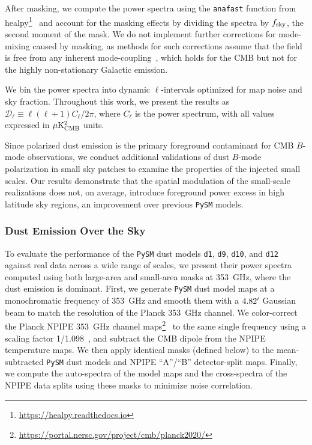\documentclass[twocolumn]{aastex631}
\begin{document}
After masking, we compute the power spectra using the \texttt{anafast} function from healpy\footnote{\url{https://healpy.readthedocs.io}}~\citep{Zonca:2019} and account for the masking effects by dividing the spectra by $f_{\rm sky}$, the second moment of the mask. We do not implement further corrections for mode-mixing caused by masking, as methods for such corrections assume that the field is free from any inherent mode-coupling~\citep[e.g.,][]{Hivon:2002}, which holds for the CMB but not for the highly non-stationary Galactic emission. 

We bin the power spectra into dynamic $\ell$-intervals optimized for map noise and sky fraction. Throughout this work, we present the results as $\mathcal{D}_\ell \equiv \ell(\ell + 1) C_\ell / 2\pi$, where $C_\ell$ is the power spectrum, with all values expressed in $\mu{\rm K^2_{CMB}}$ units. 

Since polarized dust emission is the primary foreground contaminant for CMB $B$-mode observations, we conduct additional validations of dust $B$-mode polarization in small sky patches to examine the properties of the injected small scales. Our results demonstrate that the spatial modulation of the small-scale realizations does not, on average, introduce foreground power excess in high latitude sky regions, an improvement over previous \texttt{PySM} models.

\subsubsection{Dust Emission Over the Sky} 
\label{sec:dust_validation}
To evaluate the performance of the \texttt{PySM} dust models \texttt{d1}, \texttt{d9}, \texttt{d10}, and \texttt{d12} against real data across a wide range of scales, we present their power spectra computed using both large-area and small-area masks at 353~GHz, where the dust emission is dominant. First, we generate \texttt{PySM} dust model maps at a monochromatic frequency of 353~GHz and smooth them with a $4.82\mbox{$^\prime$}$ Gaussian beam to match the resolution of the Planck 353~GHz channel. We color-correct the Planck NPIPE 353~GHz channel maps\footnote{\url{https://portal.nersc.gov/project/cmb/planck2020/}}~\citep{PlanckCollaboration:2020} to the same single frequency using a scaling factor 1/1.098~\citep{planck2016-l11A}, and subtract the CMB dipole from the NPIPE temperature maps. We then apply identical masks (defined below) to the mean-subtracted \texttt{PySM} dust models and NPIPE ``A''/``B'' detector-split maps. Finally, we compute the auto-spectra of the model maps and the cross-spectra of the NPIPE data splits using these masks to minimize noise correlation. 
\end{document}
